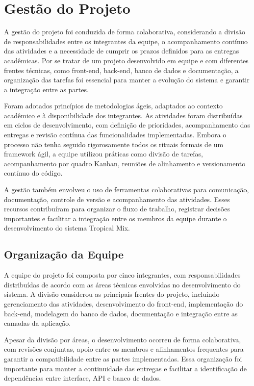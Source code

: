 \chapter{Gestão do Projeto}

A gestão do projeto foi conduzida de forma colaborativa, considerando a divisão de responsabilidades entre os integrantes da equipe, o acompanhamento contínuo das atividades e a necessidade de cumprir os prazos definidos para as entregas acadêmicas. Por se tratar de um projeto desenvolvido em equipe e com diferentes frentes técnicas, como front-end, back-end, banco de dados e documentação, a organização das tarefas foi essencial para manter a evolução do sistema e garantir a integração entre as partes.

Foram adotados princípios de metodologias ágeis, adaptados ao contexto acadêmico e à disponibilidade dos integrantes. As atividades foram distribuídas em ciclos de desenvolvimento, com definição de prioridades, acompanhamento das entregas e revisão contínua das funcionalidades implementadas. Embora o processo não tenha seguido rigorosamente todos os rituais formais de um framework ágil, a equipe utilizou práticas como divisão de tarefas, acompanhamento por quadro Kanban, reuniões de alinhamento e versionamento contínuo do código.

A gestão também envolveu o uso de ferramentas colaborativas para comunicação, documentação, controle de versão e acompanhamento das atividades. Esses recursos contribuíram para organizar o fluxo de trabalho, registrar decisões importantes e facilitar a integração entre os membros da equipe durante o desenvolvimento do sistema Tropical Mix.

\section{Organização da Equipe}

A equipe do projeto foi composta por cinco integrantes, com responsabilidades distribuídas de acordo com as áreas técnicas envolvidas no desenvolvimento do sistema. A divisão considerou as principais frentes do projeto, incluindo gerenciamento das atividades, desenvolvimento do front-end, implementação do back-end, modelagem do banco de dados, documentação e integração entre as camadas da aplicação.

Apesar da divisão por áreas, o desenvolvimento ocorreu de forma colaborativa, com revisões conjuntas, apoio entre os membros e alinhamentos frequentes para garantir a compatibilidade entre as partes implementadas. Essa organização foi importante para manter a continuidade das entregas e facilitar a identificação de dependências entre interface, API e banco de dados.

